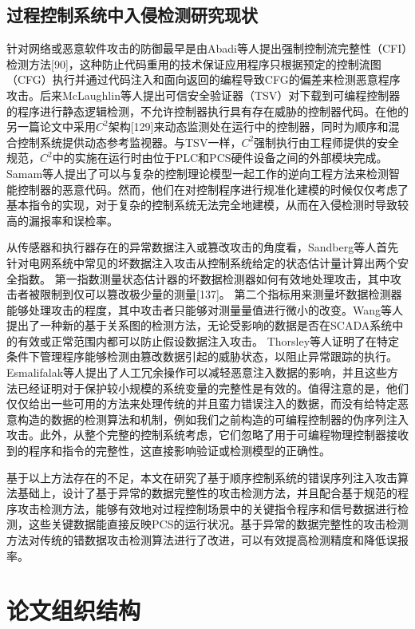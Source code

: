 \subsection{过程控制系统中入侵检测研究现状}

针对网络或恶意软件攻击的防御最早是由Abadi等人提出强制控制流完整性（CFI）检测方法[90]，这种防止代码重用的技术保证应用程序只根据预定的控制流图（CFG）执行并通过代码注入和面向返回的编程导致CFG的偏差来检测恶意程序攻击。后来McLaughlin等人提出可信安全验证器（TSV）\cite {TSV2014}对下载到可编程控制器的程序进行静态逻辑检测，不允许控制器执行具有存在威胁的控制器代码。在他的另一篇论文中采用$C^2$架构[129]来动态监测处在运行中的控制器，同时为顺序和混合控制系统提供动态参考监视器。与TSV一样，$C^2$强制执行由工程师提供的安全规范，$C^2$中的实施在运行时由位于PLC和PCS硬件设备之间的外部模块完成。 Samam等人提出了可以与复杂的控制理论模型一起工作的逆向工程方法来检测智能控制器的恶意代码\cite{Zonouz2014}。然而，他们在对控制程序进行规准化建模的时候仅仅考虑了基本指令的实现，对于复杂的控制系统无法完全地建模，从而在入侵检测时导致较高的漏报率和误检率。

从传感器和执行器存在的异常数据注入或篡改攻击的角度看，Sandberg等人首先针对电网系统中常见的坏数据注入攻击从控制系统给定的状态估计量计算出两个安全指数。 第一指数测量状态估计器的坏数据检测器如何有效地处理攻击，其中攻击者被限制到仅可以篡改极少量的测量[137]。 第二个指标用来测量坏数据检测器能够处理攻击的程度，其中攻击者只能够对测量量值进行微小的改变。Wang等人提出了一种新的基于关系图的检测方法，无论受影响的数据是否在SCADA系统中的有效或正常范围内都可以防止假设数据注入攻击\cite {wang2014}。 Thorsley等人证明了在特定条件下管理程序能够检测由篡改数据引起的威胁状态，以阻止异常跟踪的执行\cite {Thorsley2014}。 Esmalifalak等人提出了人工冗余操作可以减轻恶意注入数据的影响，并且这些方法已经证明对于保护较小规模的系统变量的完整性是有效的\cite{liu2014}。值得注意的是，他们仅仅给出一些可用的方法来处理传统的并且蛮力错误注入的数据，而没有给特定恶意构造的数据的检测算法和机制，例如我们之前构造的可编程控制器的伪序列注入攻击。此外，从整个完整的控制系统考虑，它们忽略了用于可编程物理控制器接收到的程序和指令的完整性，这直接影响验证或检测模型的正确性。

基于以上方法存在的不足，本文在研究了基于顺序控制系统的错误序列注入攻击算法基础上，设计了基于异常的数据完整性的攻击检测方法，并且配合基于规范的程序攻击检测方法，能够有效地对过程控制场景中的关键指令程序和信号数据进行检测，这些关键数据能直接反映PCS的运行状况。基于异常的数据完整性的攻击检测方法对传统的错数据攻击检测算法进行了改进，可以有效提高检测精度和降低误报率。

\section{论文组织结构}

